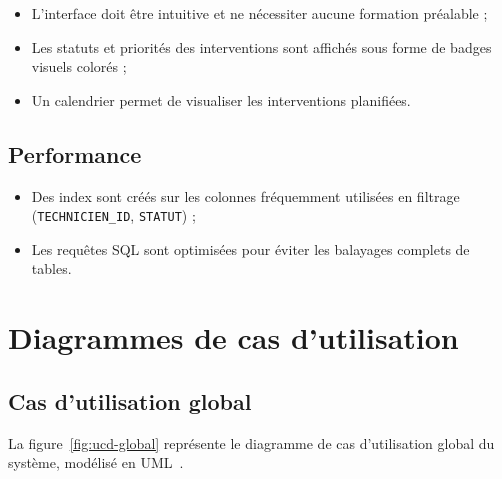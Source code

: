 \documentclass[12pt,a4paper,oneside]{report}
\begin{document}
\begin{itemize}[leftmargin=2em]
  \item L'interface doit être intuitive et ne nécessiter aucune formation préalable ;
  \item Les statuts et priorités des interventions sont affichés sous forme de badges visuels colorés ;
  \item Un calendrier permet de visualiser les interventions planifiées.
\end{itemize}

\subsection{Performance}

\begin{itemize}[leftmargin=2em]
  \item Des index sont créés sur les colonnes fréquemment utilisées en filtrage (\texttt{TECHNICIEN\_ID}, \texttt{STATUT}) ;
  \item Les requêtes SQL sont optimisées pour éviter les balayages complets de tables.
\end{itemize}

\section{Diagrammes de cas d'utilisation}

\subsection{Cas d'utilisation global}

La figure~\ref{fig:ucd-global} représente le diagramme de cas d'utilisation global du système, modélisé en UML~\cite{uml_distilled}.
\end{document}
